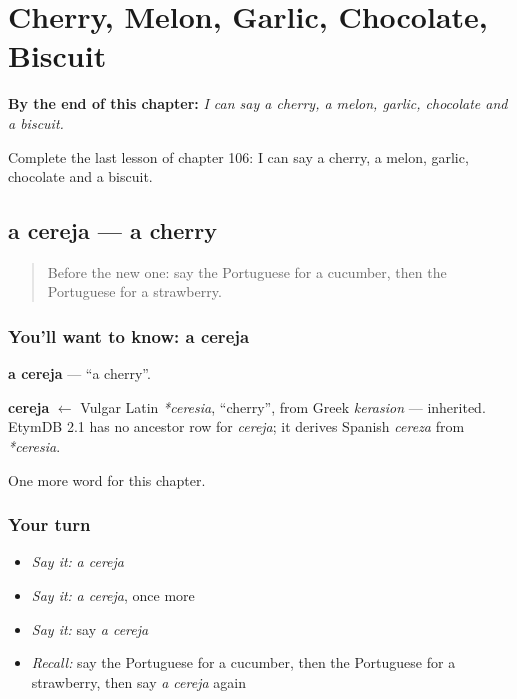 
\chapter{Cherry, Melon, Garlic, Chocolate, Biscuit}
\label{ch:pt-cherry-melon-garlic-chocolate-biscuit}

\begin{chapteropening}
\textbf{By the end of this chapter:} \emph{I can say a cherry, a melon, garlic, chocolate and a biscuit.}

Complete the last lesson of chapter 106: I can say a cherry, a melon, garlic, chocolate and a biscuit.
\end{chapteropening}

\section[a cereja]{a cereja — a cherry}

\label{lesson:PT-C106-cereja}



\begin{quote}
Before the new one: say the Portuguese for a cucumber, then the Portuguese for a strawberry.
\end{quote}

\subsection*{You'll want to know: a cereja}
\textbf{a cereja} — \textquotedblleft{}a cherry\textquotedblright{}.

\begin{cousinweb}
\textbf{cereja} $\leftarrow$ Vulgar Latin \emph{*ceresia}, \textquotedblleft{}cherry\textquotedblright{}, from Greek \emph{kerasion} — inherited. EtymDB 2.1 has no ancestor row for \emph{cereja}; it derives Spanish \emph{cereza} from \emph{*ceresia}.
\end{cousinweb}

\begin{grammarlens}[title={What you've built}]
One more word for this chapter.
\end{grammarlens}

\subsection*{Your turn}
\begin{itemize}
\raggedright
  \item \emph{Say it:} \emph{a cereja}
  \item \emph{Say it:} \emph{a cereja}, once more
  \item \emph{Say it:} say \emph{a cereja}
  \item \emph{Recall:} say the Portuguese for a cucumber, then the Portuguese for a strawberry, then say \emph{a cereja} again
\end{itemize}


